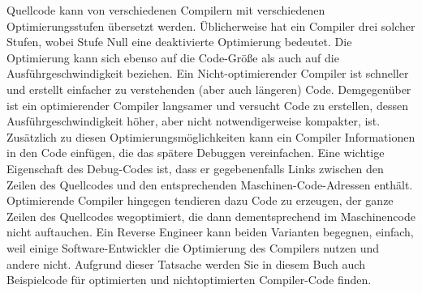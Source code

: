 Quellcode kann von verschiedenen Compilern mit verschiedenen Optimierungsstufen übersetzt werden.
Üblicherweise hat ein Compiler drei solcher Stufen, wobei Stufe Null eine deaktivierte Optimierung bedeutet.
Die Optimierung kann sich ebenso auf die Code-Größe als auch auf die Ausführgeschwindigkeit beziehen.
Ein Nicht-optimierender Compiler ist schneller und erstellt einfacher zu verstehenden (aber auch längeren) Code.
Demgegenüber ist ein optimierender Compiler langsamer und versucht Code zu erstellen, dessen Ausführgeschwindigkeit
höher, aber nicht notwendigerweise kompakter, ist.
Zusätzlich zu diesen Optimierungsmöglichkeiten kann ein Compiler Informationen in den Code einfügen, die das spätere
Debuggen vereinfachen.
Eine wichtige Eigenschaft des Debug-Codes ist, dass er gegebenenfalls Links zwischen den Zeilen des Quellcodes und
den entsprechenden Maschinen-Code-Adressen enthält.
Optimierende Compiler hingegen tendieren dazu Code zu erzeugen, der ganze Zeilen des Quellcodes wegoptimiert, die dann
dementsprechend im Maschinencode nicht auftauchen.
Ein Reverse Engineer kann beiden Varianten begegnen, einfach, weil einige Software-Entwickler die Optimierung des Compilers
nutzen und andere nicht. Aufgrund dieser Tatsache werden Sie in diesem Buch auch Beispielcode für optimierten und
nichtoptimierten Compiler-Code finden.